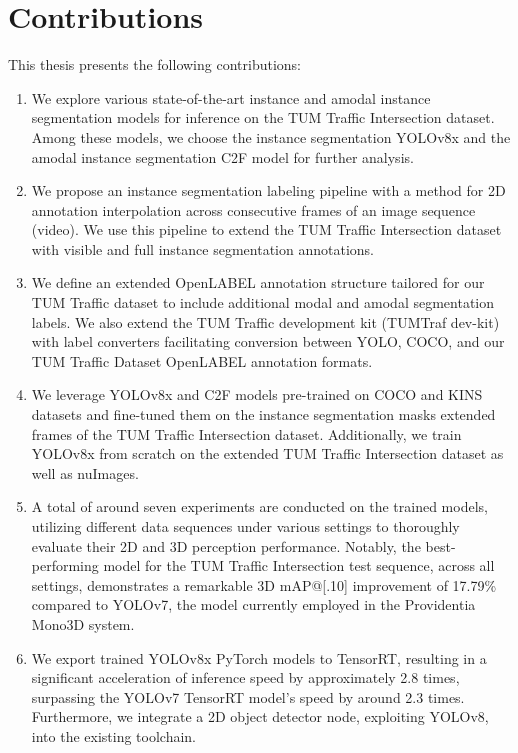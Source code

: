 \section{Contributions}

This thesis presents the following contributions: 

\begin{enumerate}
	\item We explore various state-of-the-art instance and amodal instance segmentation models for inference on the TUM Traffic Intersection dataset. Among these models, we choose the instance segmentation YOLOv8x and the amodal instance segmentation C2F model for further analysis.
	
	\item We propose an instance segmentation labeling pipeline with a method for 2D annotation interpolation across consecutive frames of an image sequence (video). We use this pipeline to extend the TUM Traffic Intersection dataset with visible and full instance segmentation annotations. 
	
	\item We define an extended OpenLABEL annotation structure tailored for our TUM Traffic dataset to include additional modal and amodal segmentation labels. We also extend the TUM Traffic development kit (TUMTraf dev-kit) with label converters facilitating conversion between YOLO, COCO, and our TUM Traffic Dataset OpenLABEL annotation formats. 
	
	\item We leverage YOLOv8x and C2F models pre-trained on COCO and KINS datasets and fine-tuned them on the instance segmentation masks extended frames of the TUM Traffic Intersection dataset. Additionally, we train YOLOv8x from scratch on the extended TUM Traffic Intersection dataset as well as nuImages. 
	
	\item A total of around seven experiments are conducted on the trained models, utilizing different data sequences under various settings to thoroughly evaluate their 2D and 3D perception performance. Notably, the best-performing model for the TUM Traffic Intersection test sequence, across all settings, demonstrates a remarkable 3D mAP@[.10] improvement of 17.79\% compared to YOLOv7, the model currently employed in the Providentia Mono3D system. 
	
	\item We export trained YOLOv8x PyTorch models to TensorRT, resulting in a significant acceleration of inference speed by approximately 2.8 times, surpassing the YOLOv7 TensorRT model's speed by around 2.3 times. Furthermore, we integrate a 2D object detector node, exploiting YOLOv8, into the existing toolchain. 
	
\end{enumerate}


